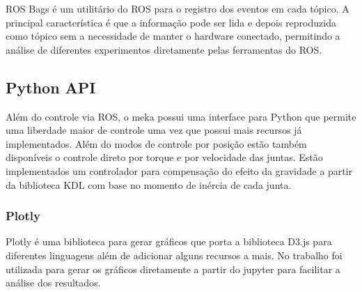 ROS Bags é um utilitário do ROS para o registro dos eventos em cada tópico. A principal característica é que a informação pode ser lida e depois reproduzida como tópico sem a necessidade de manter o hardware conectado, permitindo a análise de diferentes experimentos diretamente pelas ferramentas do ROS.

\subsection{Python API}

Além do controle via ROS, o meka possui uma interface para Python que permite uma liberdade maior de controle uma vez que possui mais recursos já implementados. Além do modos de controle por posição estão também disponíveis o controle direto por torque e por velocidade das juntas. Estão implementados um controlador para compensação do efeito da gravidade a partir da biblioteca KDL com base no momento de inércia de cada junta.

\subsubsection{Plotly}

Plotly é uma biblioteca para gerar gráficos que porta a biblioteca D3.js para diferentes linguagens além de adicionar alguns recursos a mais. No trabalho foi utilizada para gerar os gráficos diretamente a partir do jupyter para facilitar a análise dos resultados.
